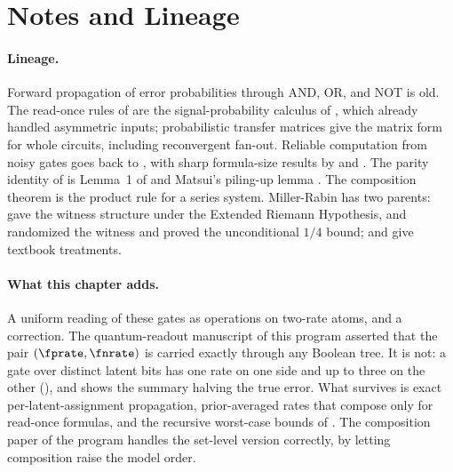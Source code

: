 %

\section{Notes and Lineage}
\label{sec:bib-notes-ch3}

\paragraph{Lineage.}
Forward propagation of error probabilities through AND, OR, and NOT is old.
The read-once rules of  are the
signal-probability calculus of \textcite{parker-mccluskey-1975}, which already
handled asymmetric inputs; probabilistic transfer matrices
\parencite{krishnaswamy-et-al-2008} give the matrix form for whole circuits,
including reconvergent fan-out. Reliable computation from noisy gates goes
back to \textcite{von-neumann-1956}, with sharp formula-size results by
\textcite{pippenger-1988} and \textcite{evans-schulman-1999}. The parity
identity of  is Lemma~1 of \textcite{gallager-1962} and
Matsui's piling-up lemma \parencite{matsui-1993}. The composition theorem is
the product rule for a series system. Miller-Rabin has two parents:
\textcite{miller-1976} gave the witness structure under the Extended Riemann
Hypothesis, and \textcite{rabin-1980} randomized the witness and proved the
unconditional $1/4$ bound; \textcite[Ch.~31]{cormen-clrs} and
\textcite{mitzenmacher-upfal} give textbook treatments.

\paragraph{What this chapter adds.}
A uniform reading of these gates as operations on two-rate atoms, and a
correction. The quantum-readout manuscript of this program
\parencite{towell-bernoulli-quantum-readout} asserted that the pair
$(\fprate, \fnrate)$ is carried exactly through any Boolean tree. It is not: a gate over distinct latent bits has one rate on one side and up to three
on the other (), and
 shows the summary halving the true error.
What survives is exact per-latent-assignment propagation, prior-averaged rates
that compose only for read-once formulas, and the recursive worst-case bounds
of . The composition paper of the program
\parencite{towell-bernoulli-composition} handles the set-level version
correctly, by letting composition raise the model order.

